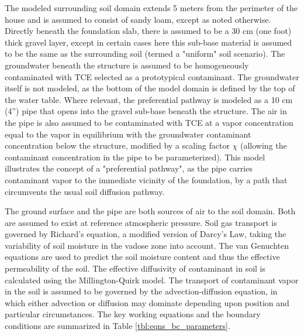 \documentclass[preprint,12pt]{elsarticle}
\begin{document}
The modeled surrounding soil domain extends 5 meters from the perimeter of the house and is assumed to consist of sandy loam, except as noted otherwise.
Directly beneath the foundation slab, there is assumed to be a 30 cm (one foot) thick gravel layer, except in certain cases here this sub-base material is assumed to be the same as the surrounding soil (termed a "uniform" soil scenario).
The groundwater beneath the structure is assumed to be homogeneously contaminated with TCE selected as a prototypical contaminant.
The groundwater itself is not modeled, as the bottom of the model domain is defined by the top of the water table.
Where relevant, the preferential pathway is modeled as a 10 cm (4”) pipe that opens into the gravel sub-base beneath the structure.
The air in the pipe is also assumed to be contaminated with TCE at a vapor concentration equal to the vapor in equilibrium with the groundwater contaminant concentration below the structure, modified by a scaling factor $\chi$ (allowing the contaminant concentration in the pipe to be parameterized).
This model illustrates the concept of a "preferential pathway", as the pipe carries contaminant vapor to the immediate vicinity of the foundation, by a path that circumvents the usual soil diffusion pathway.\par

The ground surface and the pipe are both sources of air to the soil domain.
Both are assumed to exist at reference atmospheric pressure.
Soil gas transport is governed by Richard’s equation, a modified version of Darcy’s Law, taking the variability of soil moisture in the vadose zone into account\cite{richards_capillary_1931}.
The van Genuchten equations are used to predict the soil moisture content and thus the effective permeability of the soil\cite{van_genuchten_closed-form_1980}.
The effective diffusivity of contaminant in soil is calculated using the Millington-Quirk model\cite{millington_permeability_1961}.
The transport of contaminant vapor in the soil is assumed to be governed by the advection-diffusion equation, in which either advection or diffusion may dominate depending upon position and particular circumstances.
The key working equations and the boundary conditions are summarized in Table \ref{tbl:eqns_bc_parameters}.\par
\end{document}

